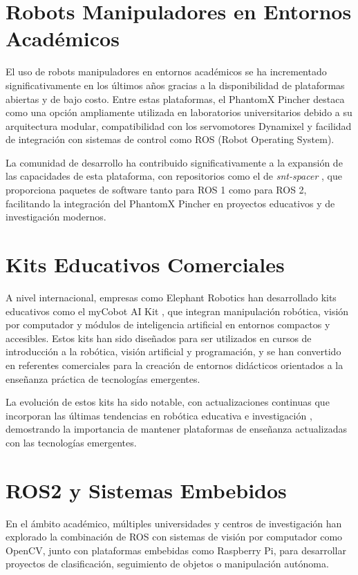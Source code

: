 \section{Robots Manipuladores en Entornos Académicos}

El uso de robots manipuladores en entornos académicos se ha incrementado significativamente en los últimos años gracias a la disponibilidad de plataformas abiertas y de bajo costo. Entre estas plataformas, el PhantomX Pincher destaca como una opción ampliamente utilizada en laboratorios universitarios debido a su arquitectura modular, compatibilidad con los servomotores Dynamixel y facilidad de integración con sistemas de control como ROS (Robot Operating System).

La comunidad de desarrollo ha contribuido significativamente a la expansión de las capacidades de esta plataforma, con repositorios como el de \textit{snt-spacer} \cite{sntspacer}, que proporciona paquetes de software tanto para ROS 1 como para ROS 2, facilitando la integración del PhantomX Pincher en proyectos educativos y de investigación modernos.

\section{Kits Educativos Comerciales}

A nivel internacional, empresas como Elephant Robotics han desarrollado kits educativos como el myCobot AI Kit \cite{ElephantRobotics2021}, que integran manipulación robótica, visión por computador y módulos de inteligencia artificial en entornos compactos y accesibles. Estos kits han sido diseñados para ser utilizados en cursos de introducción a la robótica, visión artificial y programación, y se han convertido en referentes comerciales para la creación de entornos didácticos orientados a la enseñanza práctica de tecnologías emergentes.

La evolución de estos kits ha sido notable, con actualizaciones continuas que incorporan las últimas tendencias en robótica educativa e investigación \cite{ElephantRobotics2023}, demostrando la importancia de mantener plataformas de enseñanza actualizadas con las tecnologías emergentes.

\section{ROS2 y Sistemas Embebidos}

En el ámbito académico, múltiples universidades y centros de investigación han explorado la combinación de ROS con sistemas de visión por computador como OpenCV, junto con plataformas embebidas como Raspberry Pi, para desarrollar proyectos de clasificación, seguimiento de objetos o manipulación autónoma.

